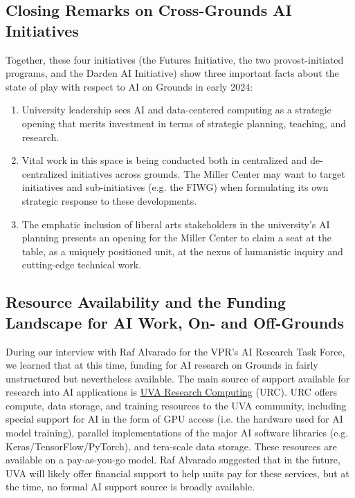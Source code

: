 \documentclass[12pt, oneside]{article}   	%
\begin{document}
\subsection{Closing Remarks on Cross-Grounds AI Initiatives}
Together, these four initiatives (the Futures Initiative, the two provost-initiated programs, and the Darden AI Initiative) show three important facts about the state of play with respect to AI on Grounds in early 2024:
\begin{enumerate}
\item University leadership sees AI and data-centered computing as a strategic opening that merits investment in terms of strategic planning, teaching, and research.
\item Vital work in this space is being conducted both in centralized and de-centralized initiatives across grounds.  The Miller Center may want to target initiatives and sub-initiatives (e.g. the FIWG) when formulating its own strategic response to these developments.
\item The emphatic inclusion of liberal arts stakeholders in the university’s AI planning presents an opening for the Miller Center to claim a seat at the table, as a uniquely positioned unit, at the nexus of humanistic inquiry and cutting-edge technical work.
\end{enumerate}


\subsection{Resource Availability and the Funding Landscape for AI Work, On- and Off-Grounds}\label{section.grounds.funding}
During our interview with Raf Alvarado for the VPR's AI Research Task Force, we learned that at this time, funding for AI research on Grounds in fairly unstructured but nevertheless available.  The main source of support available for research into AI applications is \href{https://www.rc.virginia.edu}{UVA Research Computing} (URC).  URC offers compute, data storage, and training resources to the UVA community, including special support for AI in the form of GPU access (i.e. the hardware used for AI model training), parallel implementations of the major AI software libraries (e.g. Keras/TensorFlow/PyTorch), and tera-scale data storage.  These resources are available on a pay-as-you-go model.  Raf Alvarado suggested that in the future, UVA will likely offer financial support to help units pay for these services, but at the time, no formal AI support source is broadly available.
\end{document}
